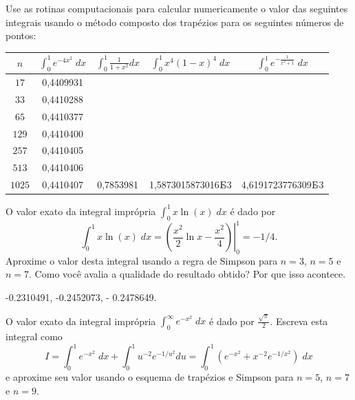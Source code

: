 \begin{exer}
Use as rotinas computacionais para calcular numericamente o valor das seguintes integrais usando o método composto dos trapézios para os seguintes números de pontos:
\begin{center}
  \begin{tabular}{|c|c|c|c|c|}
    \hline
    $n$   & $\displaystyle \int_{0}^1e^{-4x^2}\;dx$ & $\displaystyle \int_{0}^1\frac{1}{1+x^2}dx$ & $\displaystyle \int_{0}^1x^4(1-x)^4\;dx$ & $\displaystyle \int_{0}^1e^{-\frac{1}{x^2+1}}\;dx$  \\
    \hline
    $17$ & 0,4409931 & & ~\hspace{40pt}~& ~\hspace{40pt}~\\
    \hline
    $33$ & 0,4410288 &      & & \\
    \hline
    $65$ & 0,4410377  &   & &\\
    \hline
    $129$ & 0,4410400 &  & &\\
    \hline
    $257$ & 0,4410405 &  & &\\
    \hline
    $513$ & 0,4410406 & & &\\
    \hline
    $1025$ & 0,4410407 & 0,7853981 & 1,5873015873016$\E$-3  &4,6191723776309$\E$-3 \\
    \hline
  \end{tabular}
\end{center}
\end{exer}


\begin{exer}
O valor exato da integral imprópria $\int_0^1x\ln(x)\;dx$ é dado por
$$\int_0^1x\ln(x)\;dx=\left.\left(\frac{x^2}{2}\ln x-\frac{x^2}{4}\right)\right|_0^1=-1/4.$$
Aproxime o valor desta integral usando a regra  de Simpson para $n=3$, $n=5$ e $n=7$. Como você avalia a qualidade do resultado obtido? Por que isso acontece.
\end{exer}
\begin{resp}

-0.2310491, -0.2452073, - 0.2478649.

\end{resp}

\begin{exer}
O valor exato da integral imprópria $\int_0^\infty e^{-x^2}\;dx$ é dado por $\frac{\sqrt{\pi}}{2}$.
Escreva esta integral como
$$I=\int_0^1 e^{-x^2}\;dx+\int_0^1 u^{-2} e^{-1/u^2}du=\int_0^1 \left(e^{-x^2}+x^{-2}e^{-1/x^2}\right)\;dx$$
e aproxime seu valor usando o esquema de trapézios e Simpson para $n=5$, $n=7$ e $n=9$.
\end{exer}

